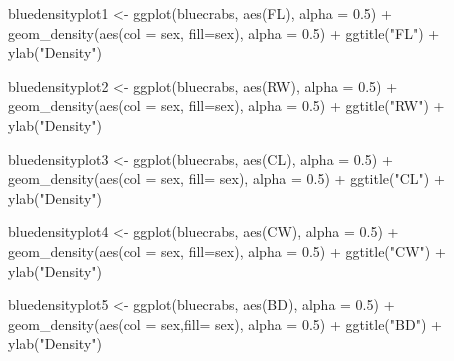 \documentclass[
]{article}
\newenvironment{Shaded}{}{}
\newcommand{\AttributeTok}[1]{#1}
\newcommand{\FloatTok}[1]{#1}
\newcommand{\FunctionTok}[1]{#1}
\newcommand{\NormalTok}[1]{#1}
\newcommand{\OtherTok}[1]{\textcolor[rgb]{1.00,0.25,0.00}{#1}}
\newcommand{\SpecialCharTok}[1]{\textcolor[rgb]{0.00,0.50,0.50}{#1}}
\newcommand{\StringTok}[1]{\textcolor[rgb]{0.00,0.50,0.50}{#1}}
\begin{document}
\begin{Shaded}
\begin{Highlighting}[]
\NormalTok{bluedensityplot1 }\OtherTok{\textless{}{-}} \FunctionTok{ggplot}\NormalTok{(bluecrabs, }\FunctionTok{aes}\NormalTok{(FL), }\AttributeTok{alpha =} \FloatTok{0.5}\NormalTok{) }\SpecialCharTok{+} 
  \FunctionTok{geom\_density}\NormalTok{(}\FunctionTok{aes}\NormalTok{(}\AttributeTok{col =}\NormalTok{ sex, }\AttributeTok{fill=}\NormalTok{sex), }\AttributeTok{alpha =} \FloatTok{0.5}\NormalTok{) }\SpecialCharTok{+}
\FunctionTok{ggtitle}\NormalTok{(}\StringTok{"FL"}\NormalTok{) }\SpecialCharTok{+} \FunctionTok{ylab}\NormalTok{(}\StringTok{"Density"}\NormalTok{)}

\NormalTok{bluedensityplot2 }\OtherTok{\textless{}{-}} \FunctionTok{ggplot}\NormalTok{(bluecrabs, }\FunctionTok{aes}\NormalTok{(RW), }\AttributeTok{alpha =} \FloatTok{0.5}\NormalTok{) }\SpecialCharTok{+} 
  \FunctionTok{geom\_density}\NormalTok{(}\FunctionTok{aes}\NormalTok{(}\AttributeTok{col =}\NormalTok{ sex, }\AttributeTok{fill=}\NormalTok{sex), }\AttributeTok{alpha =} \FloatTok{0.5}\NormalTok{) }\SpecialCharTok{+}
\FunctionTok{ggtitle}\NormalTok{(}\StringTok{"RW"}\NormalTok{) }\SpecialCharTok{+} \FunctionTok{ylab}\NormalTok{(}\StringTok{"Density"}\NormalTok{)}

\NormalTok{bluedensityplot3 }\OtherTok{\textless{}{-}} \FunctionTok{ggplot}\NormalTok{(bluecrabs, }\FunctionTok{aes}\NormalTok{(CL), }\AttributeTok{alpha =} \FloatTok{0.5}\NormalTok{) }\SpecialCharTok{+} 
  \FunctionTok{geom\_density}\NormalTok{(}\FunctionTok{aes}\NormalTok{(}\AttributeTok{col =}\NormalTok{ sex, }\AttributeTok{fill=}\NormalTok{ sex), }\AttributeTok{alpha =} \FloatTok{0.5}\NormalTok{) }\SpecialCharTok{+}
\FunctionTok{ggtitle}\NormalTok{(}\StringTok{"CL"}\NormalTok{) }\SpecialCharTok{+} \FunctionTok{ylab}\NormalTok{(}\StringTok{"Density"}\NormalTok{)}

\NormalTok{bluedensityplot4 }\OtherTok{\textless{}{-}} \FunctionTok{ggplot}\NormalTok{(bluecrabs, }\FunctionTok{aes}\NormalTok{(CW), }\AttributeTok{alpha =} \FloatTok{0.5}\NormalTok{) }\SpecialCharTok{+}
  \FunctionTok{geom\_density}\NormalTok{(}\FunctionTok{aes}\NormalTok{(}\AttributeTok{col =}\NormalTok{ sex, }\AttributeTok{fill=}\NormalTok{sex), }\AttributeTok{alpha =} \FloatTok{0.5}\NormalTok{) }\SpecialCharTok{+}
\FunctionTok{ggtitle}\NormalTok{(}\StringTok{"CW"}\NormalTok{) }\SpecialCharTok{+} \FunctionTok{ylab}\NormalTok{(}\StringTok{"Density"}\NormalTok{)}

\NormalTok{bluedensityplot5 }\OtherTok{\textless{}{-}} \FunctionTok{ggplot}\NormalTok{(bluecrabs, }\FunctionTok{aes}\NormalTok{(BD), }\AttributeTok{alpha =} \FloatTok{0.5}\NormalTok{) }\SpecialCharTok{+} 
  \FunctionTok{geom\_density}\NormalTok{(}\FunctionTok{aes}\NormalTok{(}\AttributeTok{col =}\NormalTok{ sex,}\AttributeTok{fill=}\NormalTok{ sex), }\AttributeTok{alpha =} \FloatTok{0.5}\NormalTok{) }\SpecialCharTok{+}
\FunctionTok{ggtitle}\NormalTok{(}\StringTok{"BD"}\NormalTok{) }\SpecialCharTok{+} \FunctionTok{ylab}\NormalTok{(}\StringTok{"Density"}\NormalTok{)}


\end{Highlighting}
\end{Shaded}
\end{document}
